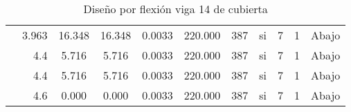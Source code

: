 \begin{table}[H]
{\begin{tabular}{|c|r|c|c|c|c|c|c|c|c|c|}
\cline{2-11}          & \multicolumn{1}{c|}{3.963} & 16.348 & 16.348 & 0.0033 & 220.000 & 387   & si    & 7     & 1     & Abajo \bigstrut\\
\cline{2-11}          & 4.4   & 5.716 & 5.716 & 0.0033 & 220.000 & 387   & si    & 7     & 1     & Abajo \bigstrut\\
\cline{2-11}          & 4.4   & 5.716 & 5.716 & 0.0033 & 220.000 & 387   & si    & 7     & 1     & Abajo \bigstrut\\
\cline{2-11}          & 4.6   & 0.000 & 0.000 & 0.0033 & 220.000 & 387   & si    & 7     & 1     & Abajo \bigstrut\\
    \hline
    \end{tabular}}%
  \caption{Diseño por flexión viga 14 de cubierta}
  \label{tab:F V14C}%
\end{table}%
